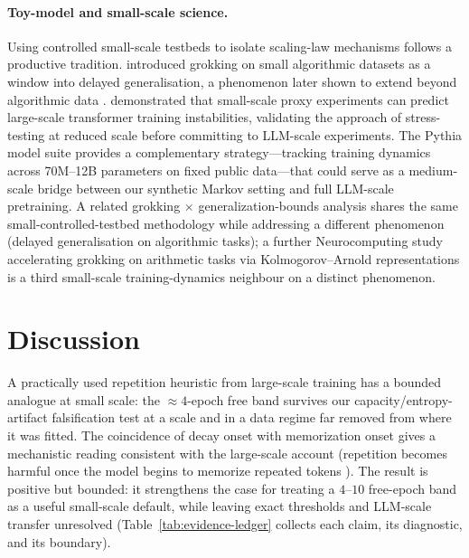 \documentclass[11pt]{article}
\begin{document}
\paragraph{Toy-model and small-scale science.}
Using controlled small-scale testbeds to isolate scaling-law
mechanisms follows a productive tradition. \citet{power2022grokking} introduced grokking on
small algorithmic datasets as a window into delayed generalisation, a phenomenon later shown
to extend beyond algorithmic data \citep{liu2023omnigrok}.
\citet{wortsman2023smallscale} demonstrated that small-scale proxy experiments can predict
large-scale transformer training instabilities, validating the approach of stress-testing
at reduced scale before committing to LLM-scale experiments. The Pythia model suite
\citep{biderman2023pythia} provides a complementary strategy---tracking training dynamics
across 70M--12B parameters on fixed public data---that could serve as a medium-scale bridge
between our synthetic Markov setting and full LLM-scale pretraining. A related
grokking $\times$ generalization-bounds analysis \citep{neucom2026grokking} shares the same
small-controlled-testbed methodology while addressing a different phenomenon (delayed
generalisation on algorithmic tasks); a further Neurocomputing study accelerating
grokking on arithmetic tasks via Kolmogorov--Arnold representations
\citep{park2025kagrokking} is a third small-scale training-dynamics neighbour on a
distinct phenomenon.

\section{Discussion}\label{sec:discussion}

A practically used repetition heuristic from large-scale training has a bounded analogue at
small scale: the ${\approx}4$-epoch free band survives our capacity/entropy-artifact
falsification test at a scale and in a data regime far removed from where it was fitted.
The coincidence of decay onset with memorization onset gives a mechanistic reading
consistent with the large-scale account (repetition becomes harmful once the model begins
to memorize repeated tokens \citep{tirumala2022memorization}). The result is positive but
bounded: it strengthens the case for treating a $4$--$10$ free-epoch band as a useful
small-scale default, while leaving exact thresholds and LLM-scale transfer unresolved
(Table~\ref{tab:evidence-ledger} collects each claim, its diagnostic, and its boundary).
\end{document}
